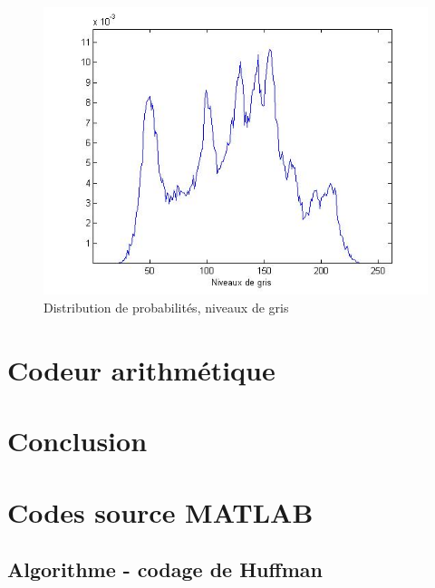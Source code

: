 \documentclass[a4paper, 12pt]{article}
\newcommand{\FSource}[1]{%

}
\begin{document}
\begin{figure}[h]
\begin{center}
	 \includegraphics[scale=0.6]{../proba.jpg}
	 \caption{\label{probaGris} Distribution de probabilités, niveaux de gris}
\end{center}
\end{figure}




\section{Codeur arithmétique}

\section{Conclusion}


\clearpage
\appendix

\section{Codes source MATLAB}
\subsection{Algorithme - codage de Huffman}\label{algohuffman}

\FSource{../huffman.m}
\end{document}
